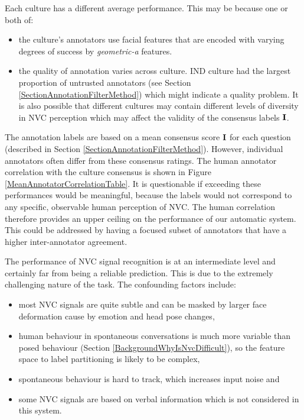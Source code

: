 Each culture has a different average performance. This may be because one or both of:

\begin{itemize}
 \item the culture's annotators use facial features that are encoded with varying degrees of success by \textit{geometric-a} features.
 \item the quality of annotation varies across culture. IND culture had the largest proportion of untrusted annotators (see Section \ref{SectionAnnotationFilterMethod}) which might indicate a quality problem. It is also possible that different cultures may contain different levels of diversity in \ac{NVC} perception which may affect the validity of the consensus labels $\textbf{I}$.
\end{itemize}

The annotation labels are based on a mean consensus score $\textbf{I}$ for each question (described in Section \ref{SectionAnnotationFilterMethod}). However, individual annotators often differ from these consensus ratings. The human annotator correlation with the culture consensus is shown in Figure \ref{MeanAnnotatorCorrelationTable}. It is questionable if exceeding these performances would be meaningful, because the labels would not correspond to any specific, observable human perception of \ac{NVC}. The human correlation therefore provides an upper ceiling on the performance of our automatic system. This could be addressed by having a focused subset of annotators that have a higher inter-annotator agreement.

The performance of \ac{NVC} signal recognition is at an intermediate level and certainly far from being a reliable prediction. This is due to the extremely challenging nature of the task. The confounding factors include:

\begin{itemize}
 \item most \ac{NVC} signals are quite subtle and can be masked by larger face deformation cause by emotion and head pose changes,
 \item human behaviour in spontaneous conversations is much more variable than posed behaviour (Section \ref{BackgroundWhyIsNvcDifficult}), so the feature space to label partitioning is likely to be complex,
 \item spontaneous behaviour is hard to track, which increases input noise and
 \item some \ac{NVC} signals are based on verbal information which is not considered in this system.
\end{itemize}


